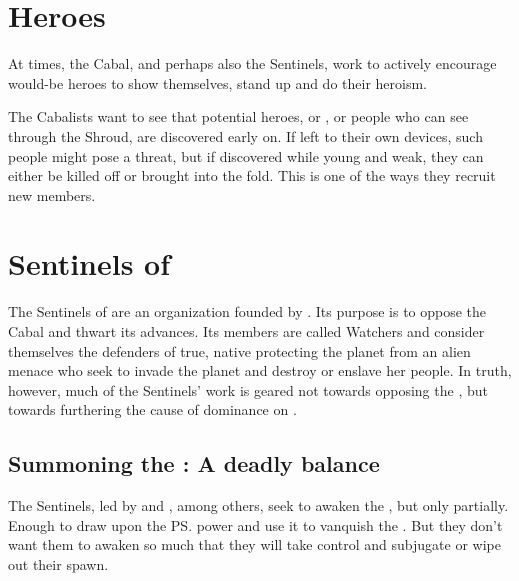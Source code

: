 \section{Heroes}
At times, the Cabal, and perhaps also the Sentinels, work to actively encourage would-be heroes to show themselves, stand up and do their heroism.

The Cabalists want to see that potential heroes, or \vertices, or people who can see through the Shroud, are discovered early on. If left to their own devices, such people might pose a threat, but if discovered while young and weak, they can either be killed off or brought into the fold. This is one of the ways they recruit new members. 















\section{Sentinels of \Miith}
The Sentinels of \Miith{} are an organization founded by \dragons{}. Its purpose is to oppose the Cabal and thwart its advances. Its members are called Watchers and consider themselves the defenders of \Miith\dash{}true, native \Miithians protecting the planet from an alien menace who seek to invade the planet and destroy or enslave her people. In truth, however, much of the Sentinels' work is geared not towards opposing the \banes{}, but towards furthering the cause of \draconic{} dominance on \Miith{}. 









\subsection{Summoning the \xss: A deadly balance}
The Sentinels, led by \Secherdamon{} and \Vizsherioch, among others, seek to awaken the \xss, but only partially. Enough to draw upon the \ps{\xss}{} power and use it to vanquish the \banes. But they don't want them to awaken so much that they will take control and subjugate or wipe out their \draconic{} spawn. 

